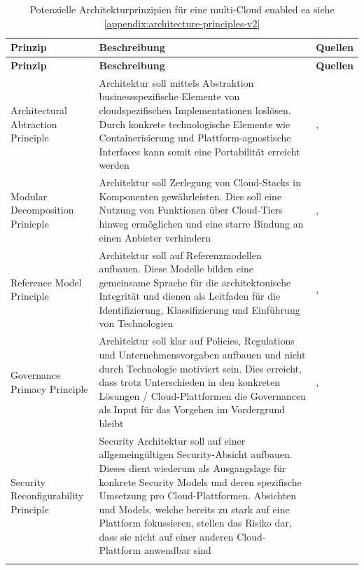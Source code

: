 \begin{longtable}{|
  L{3cm}|
  p{\dimexpr\textwidth-6cm-6\arrayrulewidth\relax}|
  L{3cm}|
}
    \hline
    \textbf{Prinzip} & \textbf{Beschreibung} & \textbf{Quellen} \\
    \hline
    \endfirsthead

    \hline
    \textbf{Prinzip} & \textbf{Beschreibung} & \textbf{Quellen} \\
    \hline
    \endhead

    Architectural Abtraction Principle &
    Architektur soll mittels Abstraktion businessspezifische Elemente von cloudspezifischen Implementationen loslösen. Durch konkrete technologische Elemente wie Containerisierung und Plattform-agnostische Interfaces kann somit eine Portabilität erreicht werden &
    \cite{srikanth_gurram_multi-cloud_2025}, \cite{erl_cloud_2013}
    \\
    \hline
    Modular Decomposition Prinicple &
    Architektur soll Zerlegung von Cloud-Stacks in Komponenten gewährleisten. Dies soll eine Nutzung von Funktionen über Cloud-Tiers hinweg ermöglichen und eine starre Bindung an einen Anbieter verhindern &
    \cite{papazoglou_cloud_2012}, \cite{tritsiniotis_get_2016}
    \\
    \hline
    Reference Model Principle &
    Architektur soll auf Referenzmodellen aufbauen. Diese Modelle bilden eine gemeinsame Sprache für die architektonische Integrität und dienen als Leitfaden für die Identifizierung, Klassifizierung und Einführung von Technologien &
    \cite{kratzke_clouns_2016}, \cite{zhang_ccoa_2009}
    \\
    \hline
    Governance Primacy Principle &
    Architektur soll klar auf Policies, Regulations und Unternehmensvorgaben aufbauen und nicht durch Technologie motiviert sein. Dies erreicht, dass trotz Unterschieden in den konkreten Lösungen / Cloud-Plattformen die Governancen als Input für das Vorgehen im Vordergrund bleibt &
    \cite{zhang_ccoa_2009}, \cite{gurram_multi-cloud_2025}
    \\
    \hline
    Security Reconfigurability Principle &
    Security Architektur soll auf einer allgemeingültigen Security-Absicht aufbauen. Dieses dient wiederum als Ausgangslage für konkrete Security Models und deren spezifische Umsetzung pro Cloud-Plattformen. Absichten und Models, welche bereits zu stark auf eine Plattform fokussieren, stellen das Risiko dar, dass sie nicht auf einer anderen Cloud-Plattform anwendbar sind &
    \cite{hajjat_cloudward_2010}
    \\
    \hline
    \caption{Potenzielle Architekturprinzipien für eine multi-Cloud enabled \ac{ea} siehe \autoref{appendix:architecture-principles-v2} }
    \label{tab:architecture-principles}
\end{longtable}


